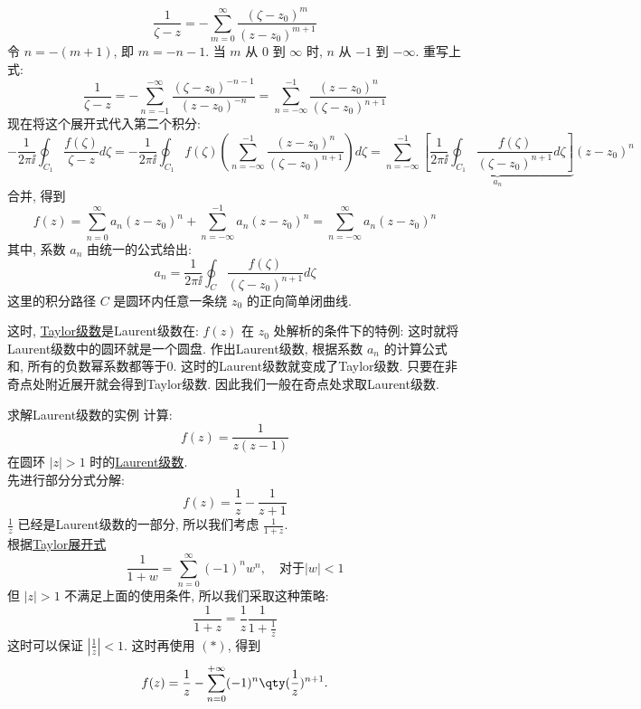\documentclass[UTF8]{ctexart}
\begin{document}
\begin{prf}
            \[\frac{1}{\zeta - z} = -\sum_{m=0}^{\infty} \frac{(\zeta - z_0)^m}{(z - z_0)^{m+1}}\]
            令  \(n = -(m+1)\), 即  \(m = -n - 1\). 当  \(m\)  从  \(0\)  到  \(\infty\)  时,  \(n\)  从  \(-1\)  到  \(-\infty\). 重写上式: 
            \[\frac{1}{\zeta - z} = -\sum_{n=-1}^{-\infty} \frac{(\zeta - z_0)^{-n-1}}{(z - z_0)^{-n}} = \sum_{n=-\infty}^{-1} \frac{(z - z_0)^n}{(\zeta - z_0)^{n+1}}\]
            现在将这个展开式代入第二个积分: 
            \[-\frac{1}{2\pi\ii} \oint_{C_1} \frac{f(\zeta)}{\zeta - z}  d\zeta = -\frac{1}{2\pi\ii} \oint_{C_1} f(\zeta) \left( \sum_{n=-\infty}^{-1} \frac{(z - z_0)^n}{(\zeta - z_0)^{n+1}} \right) d\zeta = \sum_{n=-\infty}^{-1} \underbrace{\left[ \frac{1}{2\pi\ii} \oint_{C_1} \frac{f(\zeta)}{(\zeta - z_0)^{n+1}} d\zeta \right]}_{a_n} (z - z_0)^n\]
            合并, 得到
            \[f(z) = \sum_{n=0}^{\infty} a_n (z - z_0)^n + \sum_{n=-\infty}^{-1} a_n (z - z_0)^n = \sum_{n=-\infty}^{\infty} a_n (z - z_0)^n\]
            其中, 系数  \(a_n\)  由统一的公式给出: 
            \[a_n = \frac{1}{2\pi\ii} \oint_C \frac{f(\zeta)}{(\zeta - z_0)^{n+1}}  d\zeta\]
            这里的积分路径  \(C\)  是圆环内任意一条绕  \(z_0\)  的正向简单闭曲线. 
        \end{prf}

        这时, \hyperref[thm:TaylorSeries]{Taylor级数}是Laurent级数在:  \(f(z)\) 在 \(z_0\) 处解析的条件下的特例: 这时就将Laurent级数中的圆环就是一个圆盘. 作出Laurent级数, 根据系数 \(a_n\) 的计算公式和\CauchyThm, 所有的负数幂系数都等于0. 这时的Laurent级数就变成了Taylor级数. 只要在非奇点处附近展开就会得到Taylor级数. 因此我们一般在奇点处求取Laurent级数. 

        \begin{xmp}
            {求解Laurent级数的实例}
            计算: 
            \[f(z)=\frac{1}{z(z-1)}\]
            在圆环 \(|z|>1\) 时的\hyperref[thm:Laurent]{Laurent级数}.\\
            先进行部分分式分解: 
            \[f(z)=\frac{1}{z}-\frac{1}{z+1}\]
            \(\frac{1}{z}\) 已经是Laurent级数的一部分, 所以我们考虑 \(\frac{1}{1+z}\).\\
            根据\hyperref[xmp:TaylorCommon]{Taylor展开式}
            \[\frac{1}{1 + w} = \sum_{n=0}^{\infty} (-1)^n w^n, \quad \text{对于} |w| < 1\tag{ \(\ast\) }\]
            但 \(|z|>1\) 不满足上面的使用条件, 所以我们采取这种策略: 
            \[\frac{1}{1+z}=\frac{1}{z}\frac{1}{1+\frac{1}{z}}\]
            这时可以保证 \(\left\lvert \frac{1}{z}\right\rvert <1\). 这时再使用 \((\ast)\), 得到
            \[f(z)=\frac{1}{z}-\sum_{n=0}^{+\infty}(-1)^n\qty(\frac{1}{z})^{n+1}.\]
        \end{xmp}
\end{document}

